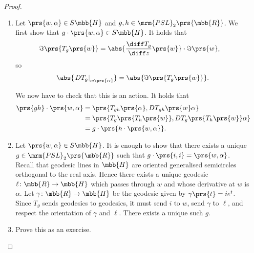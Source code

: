 \documentclass[10pt, twoside]{book}
\begin{document}
\begin{proof}
\begin{enumerate}
\item Let $\prs{w,\alpha} \in S\mbb{H}$ and $g,h \in \mrm{PSL}_2\prs{\mbb{R}}$. We first show that $g \cdot \prs{w,\alpha} \in S\mbb{H}$.
It holds that
\begin{align*}
\Im\prs{T_g\prs{w}} &=
\abs{\frac{\diff T_g}{\diff z}\prs{w}} \cdot \Im\prs{w} \text{,}
\end{align*}
so
\begin{align*}
\abs{\left. D T_g \right|_{w \prs{\alpha}}} = \abs{\Im\prs{T_g\prs{w}}} \text{.}
\end{align*}

We now have to check that this is an action. It holds that
\begin{align*}
\prs{gh} \cdot \prs{w,\alpha} &= \prs{T_{gh}\prs{\alpha}, D T_{gh} \prs{w} \alpha}
\\&= \prs{T_g \prs{T_h\prs{w}}, D T_g \prs{T_h\prs{w}} \alpha}
\\&= g \cdot \prs{h \cdot \prs{w,\alpha}} \text{.}
\end{align*}

\item Let $\prs{w, \alpha} \in S \mbb{H}$. It is enough to show that there exists a unique $g \in \mrm{PSL}_2\prs{\mbb{R}}$ such that $g \cdot \prs{i,i} = \prs{w, \alpha}$. Recall that geodesic lines in $\mbb{H}$ are oriented generalised semicircles orthogonal to the real axis. Hence there exists a unique geodesic $\ell \colon \mbb{R} \to \mbb{H}$ which passes through $w$ and whose derivative at $w$ is $\alpha$.
Let $\gamma \colon \mbb{R} \to \mbb{H}$ be the geodesic given by $\gamma\prs{t} = ie^{t}$. Since $T_g$ sends geodesics to geodesics, it must send $i$ to $w$, send $\gamma$ to $\ell$, and respect the orientation of $\gamma$ and $\ell$. There exists a unique such $g$.

\item Prove this as an exercise.
\end{enumerate}
\end{proof}
\end{document}
